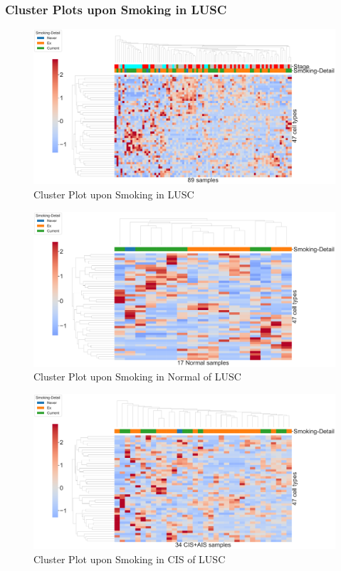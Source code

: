 \documentclass{beamer}
\begin{document}
    \begin{frame}[allowframebreaks]
        \frametitle{Cluster Plots upon Smoking in LUSC}

        \begin{figure}
            \includegraphics[width=0.9 \linewidth]{figures/BisqueRNA/clustermap/STAR.FPKM.GSE131907.SQC.Smoking/All.pdf}
            \caption{Cluster Plot upon Smoking in LUSC}
        \end{figure}

        \begin{figure}
            \includegraphics[width=0.9 \linewidth]{figures/BisqueRNA/clustermap/STAR.FPKM.GSE131907.SQC.Smoking/Normal.pdf}
            \caption{Cluster Plot upon Smoking in Normal of LUSC}
        \end{figure}

        \begin{figure}
            \includegraphics[width=0.9 \linewidth]{figures/BisqueRNA/clustermap/STAR.FPKM.GSE131907.SQC.Smoking/CIS+AIS.pdf}
            \caption{Cluster Plot upon Smoking in CIS of LUSC}
        \end{figure}


\end{frame}
\end{document}
